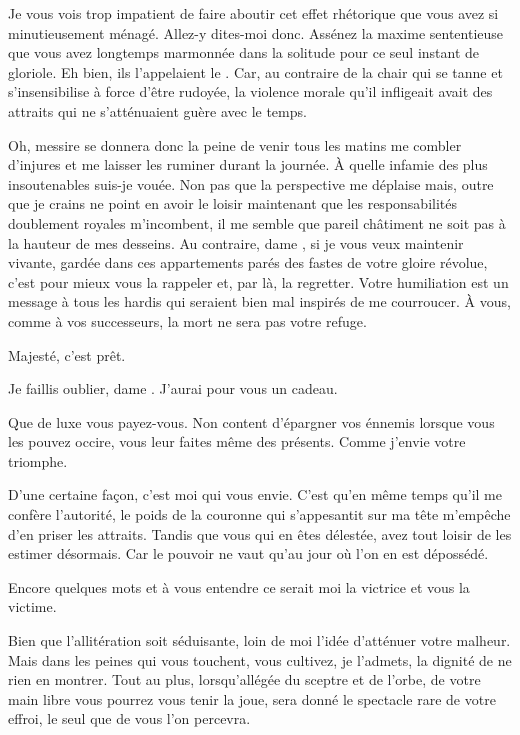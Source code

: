 \begin{drama}
  \reinespeaks Je vous vois trop impatient de faire aboutir cet effet rhétorique que vous avez si minutieusement ménagé. Allez-y dites-moi donc. Assénez la maxime sententieuse que vous avez longtemps marmonnée dans la solitude pour ce seul instant de gloriole.
  \elenaspeaks Eh bien, ils l’appelaient le . Car, au contraire de la chair qui se tanne et s’insensibilise à force d’être rudoyée, la violence morale qu’il infligeait avait des attraits qui ne s’atténuaient guère avec le temps.

  \reinespeaks Oh, messire se donnera donc la peine de venir tous les matins me combler d’injures et me laisser les ruminer durant la journée. À quelle infamie des plus insoutenables suis-je vouée.
  \elenaspeaks {} Non pas que la perspective me déplaise mais, outre que je crains ne point en avoir le loisir maintenant que les responsabilités doublement royales m’incombent, il me semble que pareil châtiment ne soit pas à la hauteur de mes desseins. Au contraire, dame \reine, si je vous veux maintenir vivante, gardée dans ces appartements parés des fastes de votre gloire révolue, c’est pour mieux vous la rappeler et, par là, la regretter. Votre humiliation est un message à tous les hardis qui seraient bien mal inspirés de me courroucer. À vous, comme à vos successeurs, la mort ne sera pas votre refuge.

  \intrat{\disciple}

  \disciplespeaks Majesté, c’est prêt.

  \elenaspeaks Je faillis oublier, dame \reine. J’aurai pour vous un cadeau.

  \reinespeaks Que de luxe vous payez-vous. Non content d’épargner vos énnemis lorsque vous les pouvez occire, vous leur faites même des présents. Comme j’envie votre triomphe.

  \elenaspeaks D’une certaine façon, c’est moi qui vous envie. C’est qu’en même temps qu’il me confère l’autorité, le poids de la couronne qui s’appesantit sur ma tête m’empêche d’en priser les attraits. Tandis que vous qui en êtes délestée, avez tout loisir de les estimer désormais. Car le pouvoir ne vaut qu’au jour où l’on en est dépossédé.

  \reinespeaks Encore quelques mots et à vous entendre ce serait moi la victrice et vous la victime.

  \elenaspeaks Bien que l’allitération soit séduisante, loin de moi l’idée d’atténuer votre malheur. Mais dans les peines qui vous touchent, vous cultivez, je l’admets, la dignité de ne rien en montrer. Tout au plus, lorsqu’allégée du sceptre et de l’orbe, de votre main libre vous pourrez vous tenir la joue, sera donné le spectacle rare de votre effroi, le seul que de vous l’on percevra.


\end{drama}
